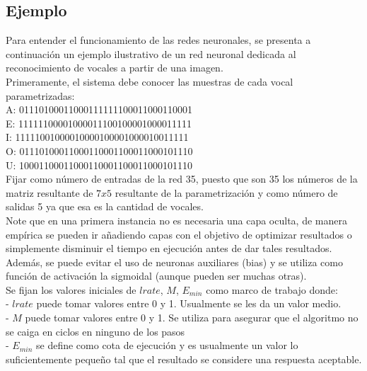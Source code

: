 \documentclass{llncs}
\begin{document}
\begin{multicols}{2}[]
\section{Ejemplo}

Para entender el funcionamiento de las redes neuronales, se presenta a continuaci\'on un ejemplo ilustrativo de un red neuronal dedicada al
reconocimiento de vocales a partir de una imagen.\\


Primeramente, el sistema debe conocer las muestras de cada vocal parametrizadas:\\

A: 01110100011000111111100011000110001 \\

E: 11111100001000011100100001000011111 \\

I: 11111001000010000100001000010011111 \\

O: 01110100011000110001100011000101110 \\

U: 10001100011000110001100011000101110 \\

Fijar como n\'umero de entradas de la red 35, puesto que son 35 los n\'umeros de la matriz resultante de $7x5$ resultante de la parametrizaci\'on
y como n\'umero de salidas 5 ya que esa es la cantidad de vocales.\\

Note que en una primera instancia no es necesaria una capa oculta, de manera emp\'irica se pueden ir a\~nadiendo capas con el objetivo de optimizar
resultados o simplemente disminuir el tiempo en ejecuci\'on antes de dar tales resultados. Adem\'as, se puede evitar el uso de neuronas auxiliares (bias)
y se utiliza como funci\'on de activaci\'on la sigmoidal (aunque pueden ser muchas otras). \\
Se fijan los valores iniciales de $lrate$, $M$, $E_{min}$ como marco de trabajo donde:\\
- $lrate$ puede tomar valores entre 0 y 1. Usualmente se les da un valor medio. \\
- $M$ puede tomar valores entre 0 y 1. Se utiliza para asegurar que el algoritmo no se caiga en ciclos en ninguno de los pasos\\
- $E_{min}$ se define como cota de ejecuci\'on y es usualmente un valor lo suficientemente peque\~no tal que el resultado se considere una respuesta aceptable.


\end{multicols}
\end{document}
